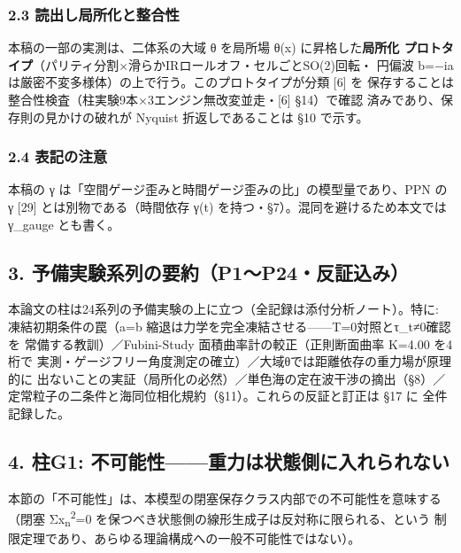 \documentclass[
]{ltjarticle}
\begin{document}
\subsubsection{2.3
読出し局所化と整合性}\label{ux8aadux51faux3057ux5c40ux6240ux5316ux3068ux6574ux5408ux6027}

本稿の一部の実測は、二体系の大域 θ を局所場 θ(x)
に昇格した\textbf{局所化
プロトタイプ}（パリティ分割×滑らかIRロールオフ・セルごとSO(2)回転・
円偏波 b=−ia は厳密不変多様体）の上で行う。このプロトタイプが分類
{[}6{]} を
保存することは整合性検査（柱実験9本×3エンジン無改変並走・{[}6{]}
§14）で確認 済みであり、保存則の見かけの破れが Nyquist
折返しであることは §10 で示す。

\subsubsection{2.4 表記の注意}\label{ux8868ux8a18ux306eux6ce8ux610f}

本稿の γ は「空間ゲージ歪みと時間ゲージ歪みの比」の模型量であり、PPN の
γ {[}29{]} とは別物である（時間依存 γ(t)
を持つ・§7）。混同を避けるため本文では γ\_gauge とも書く。

\subsection{3.
予備実験系列の要約（P1〜P24・反証込み）}\label{ux4e88ux5099ux5b9fux9a13ux7cfbux5217ux306eux8981ux7d04p1p24ux53cdux8a3cux8fbcux307f}

本論文の柱は24系列の予備実験の上に立つ（全記録は添付分析ノート）。特に:
凍結初期条件の罠（a=b
縮退は力学を完全凍結させる------T=0対照とτ\_t≠0確認を
常備する教訓）／Fubini-Study 面積曲率計の較正（正則断面曲率 K=4.00
を4桁で
実測・ゲージフリー角度測定の確立）／大域θでは距離依存の重力場が原理的に
出ないことの実証（局所化の必然）／単色海の定在波干渉の摘出（§8）／
定常粒子の二条件と海同位相化規約（§11）。これらの反証と訂正は §17 に
全件記録した。

\subsection{4. 柱G1:
不可能性------重力は状態側に入れられない}\label{ux67f1g1-ux4e0dux53efux80fdux6027ux91cdux529bux306fux72b6ux614bux5074ux306bux5165ux308cux3089ux308cux306aux3044}

本節の「不可能性」は、本模型の閉塞保存クラス内部での不可能性を意味する
（閉塞 Σx\textsubscript{n}\textsuperscript{2}=0
を保つべき状態側の線形生成子は反対称に限られる、という
制限定理であり、あらゆる理論構成への一般不可能性ではない）。
\end{document}
